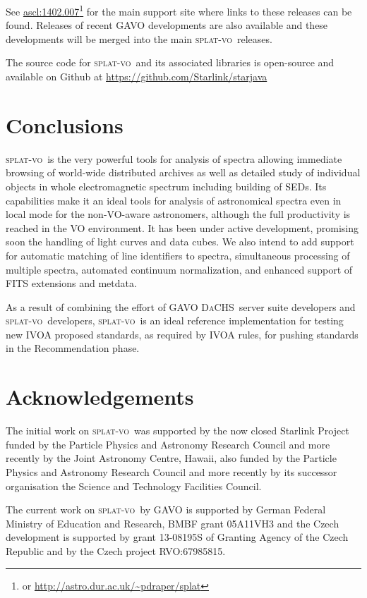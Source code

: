 \documentclass[final,authoryear,5p,times,twocolumn]{elsarticle}
\newcommand{\splatvo}{\textsc{splat-vo}}
\newcommand{\dachs}{\textsc{DaCHS}}
\newcommand{\ascl}[1]{\href{http://www.ascl.net/#1}{ascl:#1}}
\begin{document}
See \ascl{1402.007}\footnote{or \url{http://astro.dur.ac.uk/~pdraper/splat}}
for the main support site where links to these releases can be found.
Releases of recent GAVO developments are also available and these
developments will be merged into the main \splatvo\ releases.

The source code for \splatvo\ and its associated libraries is
open-source and available on Github at
\url{https://github.com/Starlink/starjava}


\section{Conclusions}

\splatvo\ is the very powerful tools for analysis of spectra
allowing immediate browsing of world-wide distributed archives as well
as detailed study of individual objects in whole electromagnetic
spectrum including building of SEDs. Its capabilities make it an
ideal tools for analysis of astronomical spectra even in local mode
for the non-VO-aware astronomers, although the full productivity is
reached in the VO environment. It has been under active development, promising soon the handling of
light curves and data cubes. We also intend to add support for
automatic matching of line identifiers to spectra, simultaneous
processing of multiple spectra, automated continuum normalization, and
enhanced support of FITS extensions and metdata.

As a result of combining the effort of GAVO \dachs\ server suite
developers and \splatvo\ developers, \splatvo\ is an ideal reference
implementation for testing new IVOA proposed standards, as required by
IVOA rules, for pushing standards in the Recommendation phase.

\section*{Acknowledgements}

The initial work on \splatvo\ was supported
by the now closed Starlink Project funded by the Particle Physics and
Astronomy Research Council and more recently by the Joint Astronomy
Centre, Hawaii, also funded by the Particle Physics and Astronomy
Research Council and more recently by its successor organisation the
Science and Technology Facilities Council.

The current work on \splatvo\ by GAVO is supported by German Federal
Ministry of Education and Research, BMBF grant 05A11VH3 and the Czech
development is supported by grant 13-08195S of Granting Agency of the
Czech Republic and by the Czech project RVO:67985815.
\end{document}
